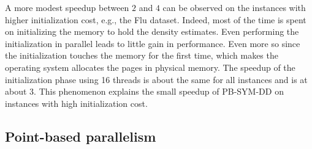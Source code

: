 \documentclass[10pt, conference, compsocconf]{IEEEtran}
\begin{document}
A more modest speedup between $2$ and $4$ can be observed on the
instances with higher initialization cost, e.g., the Flu
dataset. Indeed, most of the time is spent on initializing the memory
to hold the density estimates. Even performing the initialization in parallel leads to little gain in performance. Even more so since the initialization touches the memory
for the first time, which makes the operating system
allocates the pages in physical memory. The speedup of the
initialization phase using 16 threads is about the same for all
instances and is at about $3$. This phenomenon explains the small speedup of PB-SYM-DD on
instances with high initialization cost. 



\subsection{Point-based parallelism}




\end{document}

